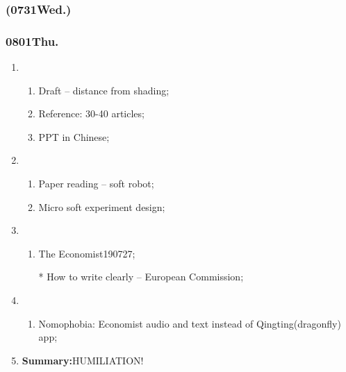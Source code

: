 \subsubsection{(0731Wed.)}
\subsubsection{0801Thu.}
\begin{enumerate}
	\item \ncquaone
	\begin{enumerate}[(1)]
		\item Draft -- distance from shading;\rightundoneBlack
		\item Reference: 30-40 articles;\rightundoneBlack
		\item PPT in Chinese;\rightundoneBlack
	\end{enumerate}
	
	\item \ncquatwo	
	\begin{enumerate}[(1)]
		\item Paper reading -- soft robot;\rightundoneBlack
		\item Micro soft experiment design;\rightundoneBlack
	\end{enumerate}
	
	\item \ncquathree
	\begin{enumerate}[(1)]
		\item The Economist190727;\rightundoneBlack
		\item[*]How to write clearly -- European Commission;\rightdone
	\end{enumerate}
	
	\item \ncquafour
	\begin{enumerate}[(1)]
		\item Nomophobia: Economist audio and text instead of Qingting(dragonfly) app;
		
		\rightundoneBlack
	\end{enumerate}
	\item \textbf{Summary:}HUMILIATION! 
\end{enumerate}
